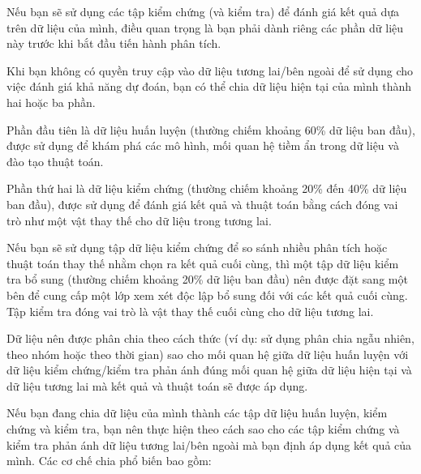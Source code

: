 Nếu bạn sẽ sử dụng các tập kiểm chứng (và kiểm tra) để đánh giá kết quả dựa trên dữ liệu của mình, điều quan trọng là bạn phải dành riêng các phần dữ liệu này trước khi bắt đầu tiến hành phân tích.

\begin{tcolorbox}[title={Hộp 1.4: Vai trò của Tập dữ liệu Huấn luyện, Kiểm chứng và Kiểm tra}]
Khi bạn không có quyền truy cập vào dữ liệu tương lai/bên ngoài để sử dụng cho việc đánh giá khả năng dự đoán, bạn có thể chia dữ liệu hiện tại của mình thành hai hoặc ba phần.

Phần đầu tiên là dữ liệu huấn luyện (thường chiếm khoảng 60\% dữ liệu ban đầu), được sử dụng để khám phá các mô hình, mối quan hệ tiềm ẩn trong dữ liệu và đào tạo thuật toán.

Phần thứ hai là dữ liệu kiểm chứng (thường chiếm khoảng 20\% đến 40\% dữ liệu ban đầu), được sử dụng để đánh giá kết quả và thuật toán bằng cách đóng vai trò như một vật thay thế cho dữ liệu trong tương lai.

Nếu bạn sẽ sử dụng tập dữ liệu kiểm chứng để so sánh nhiều phân tích hoặc thuật toán thay thế nhằm chọn ra kết quả cuối cùng, thì một tập dữ liệu kiểm tra bổ sung (thường chiếm khoảng 20\% dữ liệu ban đầu) nên được đặt sang một bên để cung cấp một lớp xem xét độc lập bổ sung đối với các kết quả cuối cùng. Tập kiểm tra đóng vai trò là vật thay thế cuối cùng cho dữ liệu tương lai.

Dữ liệu nên được phân chia theo cách thức (ví dụ: sử dụng phân chia ngẫu nhiên, theo nhóm hoặc theo thời gian) sao cho mối quan hệ giữa dữ liệu huấn luyện với dữ liệu kiểm chứng/kiểm tra phản ánh đúng mối quan hệ giữa dữ liệu hiện tại và dữ liệu tương lai mà kết quả và thuật toán sẽ được áp dụng.
\end{tcolorbox}

Nếu bạn đang chia dữ liệu của mình thành các tập dữ liệu huấn luyện, kiểm chứng và kiểm tra, bạn nên thực hiện theo cách sao cho các tập kiểm chứng và kiểm tra phản ánh dữ liệu tương lai/bên ngoài mà bạn định áp dụng kết quả của mình. Các cơ chế chia phổ biến bao gồm:

